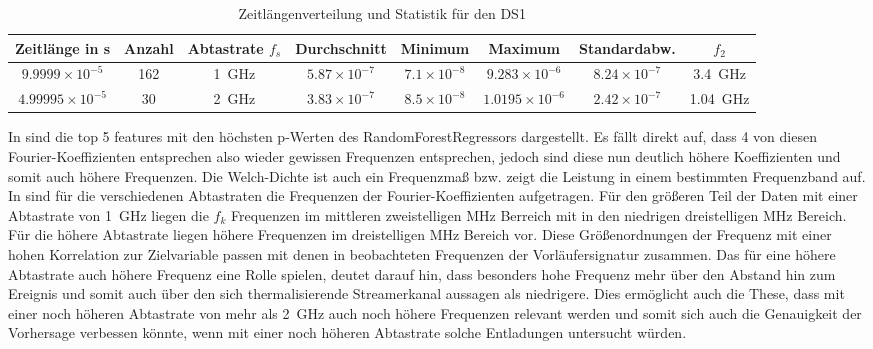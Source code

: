 \begin{table}[h!]
\centering
\begin{tabular}{|c|c|c|c|c|c|c|c|}
\hline
\textbf{Zeitlänge in s} & \textbf{Anzahl} & \textbf{Abtastrate} $f_s$ & \textbf{Durchschnitt} & \textbf{Minimum} & \textbf{Maximum} & \textbf{Standardabw.}  & \(f_2\)\\
\hline
$9.9999 \times 10^{-5}$  & 162 & \SI{1}{\giga\hertz} & $5.87 \times 10^{-7}$ & $7.1 \times 10^{-8}$ & $9.283 \times 10^{-6}$ & $8.24 \times 10^{-7}$ & \SI{3,4}{\giga\hertz}\\
$4.99995 \times 10^{-5}$ & 30  & \SI{2}{\giga\hertz} & $3.83 \times 10^{-7}$ & $8.5 \times 10^{-8}$ & $1.0195 \times 10^{-6}$ & $2.42 \times 10^{-7}$ & \SI{1,04}{\giga\hertz}\\
\hline
\end{tabular}
\caption{Zeitlängenverteilung und Statistik für den DS1}
\label{tab:ds1-sample}
\end{table}

In  sind die top 5 features mit den höchsten p-Werten des RandomForestRegressors dargestellt. Es fällt direkt auf, dass 4 von diesen Fourier-Koeffizienten entsprechen also wieder gewissen Frequenzen entsprechen, jedoch sind diese nun deutlich höhere Koeffizienten und somit auch höhere Frequenzen. Die Welch-Dichte ist auch ein Frequenzmaß bzw. zeigt die Leistung in einem bestimmten Frequenzband auf. In  sind für die verschiedenen Abtastraten die Frequenzen der Fourier-Koeffizienten aufgetragen. Für den größeren Teil der Daten mit einer Abtastrate von \SI{1}{\giga\hertz} liegen die \(f_k\) Frequenzen im mittleren zweistelligen MHz Berreich mit in den niedrigen dreistelligen MHz Bereich. Für die höhere Abtastrate liegen höhere Frequenzen im dreistelligen MHz Bereich vor. Diese Größenordnungen der Frequenz mit einer hohen Korrelation zur Zielvariable passen mit denen in  beobachteten Frequenzen der Vorläufersignatur zusammen. Das für eine höhere Abtastrate auch höhere Frequenz eine Rolle spielen, deutet darauf hin, dass besonders hohe Frequenz mehr über den Abstand hin zum Ereignis und somit auch über den sich thermalisierende Streamerkanal aussagen als niedrigere. Dies ermöglicht auch die These, dass mit einer noch höheren Abtastrate von mehr als \SI{2}{\giga\hertz} auch noch höhere Frequenzen relevant werden und somit sich auch die Genauigkeit der Vorhersage verbessen könnte, wenn mit einer noch höheren Abtastrate solche Entladungen untersucht würden. 

